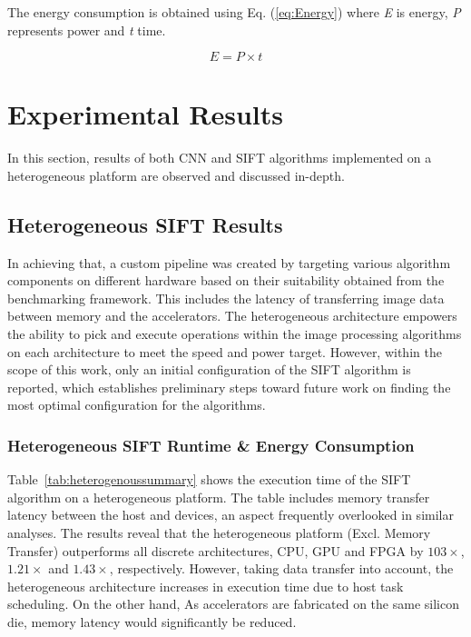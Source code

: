 The energy consumption is obtained using Eq. (\ref{eq:Energy}) where \textit{E} is energy, \textit{P} represents power and \textit{t} time.

\begin{equation}\label{eq:Energy}
E = P \times t
\end{equation}



\section{Experimental Results}
In this section, results of both CNN and SIFT algorithms implemented on a heterogeneous platform are observed and discussed in-depth.

\subsection{Heterogeneous SIFT Results}
In achieving that, a custom pipeline was created by targeting various algorithm components on different hardware based on their suitability obtained from the benchmarking framework. This includes the latency of transferring image data between memory and the accelerators. The heterogeneous architecture empowers the ability to pick and execute operations within the image processing algorithms on each architecture to meet the speed and power target. However, within the scope of this work, only an initial configuration of the SIFT algorithm is reported, which establishes preliminary steps toward future work on finding the most optimal configuration for the algorithms.
   

\subsubsection{Heterogeneous SIFT Runtime \& Energy Consumption}

Table~\ref{tab:heterogenoussummary} shows the execution time of the SIFT algorithm on a heterogeneous platform. The table includes memory transfer latency between the host and devices, an aspect frequently overlooked in similar analyses. The results reveal that the heterogeneous platform (Excl. Memory Transfer) outperforms all discrete architectures, CPU, GPU and FPGA by $103\times$, $1.21\times$ and $1.43\times$, respectively. However, taking data transfer into account, the heterogeneous architecture increases in execution time due to host task scheduling. On the other hand, As accelerators are fabricated on the same silicon die, memory latency would significantly be reduced.

